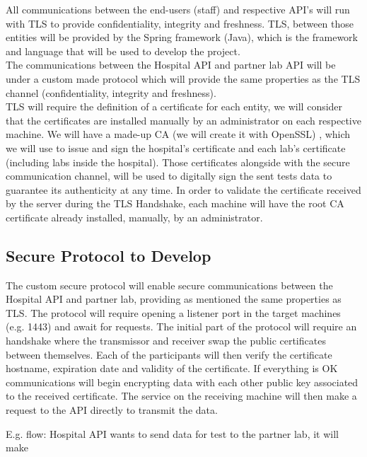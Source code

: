 All communications between the end-users (staff) and respective API's will run with TLS to provide confidentiality, integrity and freshness. TLS, between those entities will be provided by the Spring framework\cite{springmvc} (Java)\cite{java}, which is the framework and language that will be used to develop the project. \\

The communications between the Hospital API and partner lab API will be under a custom made protocol which will provide the same properties as the TLS channel (confidentiality, integrity and freshness). \\
	
TLS will require the definition of a certificate for each entity, we will consider that the certificates are installed manually by an administrator on each respective machine.
We will have a made-up CA (we will create it with OpenSSL\cite{openssl}) , which we will use to issue and sign the hospital's certificate and each lab's certificate (including labs inside the hospital). Those certificates alongside with the secure communication channel, will be used to digitally sign the sent tests data to guarantee its authenticity at any time.
In order to validate the certificate received by the server during the TLS Handshake, each machine will have the root CA certificate already installed, manually, by an administrator.\\ 

\subsection{Secure Protocol to Develop}
The custom secure protocol will enable secure communications between the Hospital API and partner lab, providing as mentioned the same properties as TLS.
The protocol will require opening a listener port in the target machines (e.g. 1443) and await for requests. The initial part of the protocol will require an handshake where the transmissor and receiver swap the public certificates between themselves. Each of the participants will then verify the certificate hostname, expiration date and validity of the certificate. If everything is OK communications will begin encrypting data with each other public key associated to the received certificate. The service on the receiving machine will then make a request to the API directly to transmit the data.

E.g. flow:
Hospital API wants to send data for test to the partner lab, it will make 


